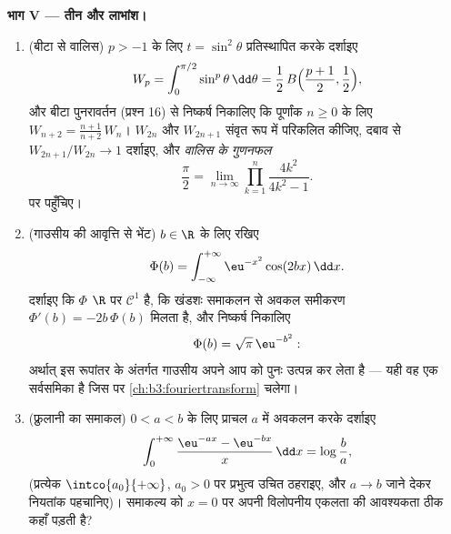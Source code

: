 \begin{problem}[{सप्ताहांत समस्या --- गाउसीय समाकल और दिरिक्ले का
समाकल, केवल प्राचलों से}]
\medskip
\noindent\textbf{भाग V --- तीन और लाभांश।}
\begin{enumerate}[resume]
  \item (बीटा से वालिस) $p > -1$ के लिए $t =
        \sin^2\theta$ प्रतिस्थापित करके
        दर्शाइए
        \[
        W_p = \int_0^{\pi/2}\sin^p\theta\,\dd\theta
        = \frac12\,B\Bigl(\frac{p+1}2, \frac12\Bigr),
        \]
        और बीटा पुनरावर्तन (प्रश्न 16) से निष्कर्ष निकालिए कि
        पूर्णांक $n \geq
        0$ के लिए $W_{n+2} = \frac{n+1}{n+2}\,W_n$। $W_{2n}$ और $W_{2n+1}$ संवृत रूप में
        परिकलित कीजिए, दबाव से $W_{2n+1}/W_{2n} \to 1$ दर्शाइए, और \emph{वालिस के
        गुणनफल}
        \[
        \frac\pi2 = \lim_{n\to\infty}
        \prod_{k=1}^{n}\frac{4k^2}{4k^2 - 1} .
        \]
        पर पहुँचिए।
  \item (गाउसीय की आवृत्ति से भेंट) $b \in \R$ के लिए रखिए
        \[
        \Phi(b) = \int_{-\infty}^{+\infty}
        \eu^{-x^2}\cos(2bx)\,\dd x .
        \]
        दर्शाइए कि $\Phi$ $\R$ पर $\mathcal C^1$ है, कि खंडशः समाकलन से
        अवकल समीकरण $\Phi'(b) = -2b\,\Phi(b)$ मिलता है, और निष्कर्ष निकालिए
        \[
        \Phi(b) = \sqrt\pi\,\eu^{-b^2} :
        \]
        अर्थात् इस रूपांतर के अंतर्गत गाउसीय अपने आप को पुनः
        उत्पन्न कर लेता है --- यही वह एक सर्वसमिका है जिस पर
        \cref{ch:b3:fouriertransform} चलेगा।
  \item (फ्रुलानी का समाकल) $0 < a < b$ के लिए प्राचल $a$ में अवकलन
        करके दर्शाइए
        \[
        \int_0^{+\infty}
        \frac{\eu^{-ax} - \eu^{-bx}}{x}\,\dd x
        = \log\frac ba ,
        \]
        (प्रत्येक $\intco{a_0}{+\infty}$, $a_0 > 0$ पर प्रभुत्व उचित ठहराइए, और $a \to b$
        जाने देकर नियतांक पहचानिए)। समाकल्य को $x = 0$ पर अपनी
        विलोपनीय एकलता की आवश्यकता ठीक कहाँ पड़ती है?
\end{enumerate}
\end{problem}
